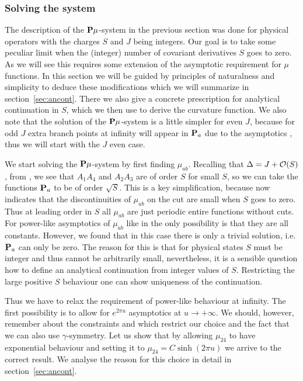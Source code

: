 \subsubsection{Solving the system}
\label{sec:slope_pmu_solve}

The description of the ${\bf P}\mu$-system in the previous section was done for physical operators with the charges $S$ and $J$ being integers. 
Our goal is to take some peculiar limit when the (integer) number of covariant derivatives $S$ goes to zero.  
As we will see this requires some extension of the asymptotic requirement for $\mu$ functions.
In this section we will be guided by principles of naturalness and simplicity to deduce these modifications which we will summarize in section~\ref{sec:ancont}. 
There we also give a concrete prescription for analytical continuation in $S$, which we then use to derive the curvature function.
We also note that the solution of the ${\bf P}\mu$-system is a little simpler for even $J$, because for odd $J$ extra branch points at infinity will appear in ${\bf P}_a$ due to the asymptotics , thus we will start with the $J$ even case.

We start solving the ${\bf P}\mu$-system by first finding $\mu_{ab}$. 
Recalling that $\Delta=J+{\cal O}(S)$, from ,  we see that $A_1A_4$ and $A_2A_3$ are of order $S$ for small $S$, so we can take the functions ${\bf P}_a$ to be of order $\sqrt{S}$. 
This is a key simplification, because now  indicates that the discontinuities of $\mu_{ab}$ on the cut are small when $S$ goes to zero. 
Thus at leading order in $S$ all $\mu_{ab}$ are just periodic entire functions without cuts.
For power-like asymptotics of $\mu_{ab}$ like in  the only possibility is that they are all constants.
However, we found that in this case there is only a trivial solution, i.e. ${\bf P}_a$ can only be zero.
The reason for this is that for physical states $S$ must be integer and thus cannot be arbitrarily small, nevertheless, it is a sensible question how to define an analytical continuation from integer values of $S$.
Restricting the large positive $S$ behaviour one can show uniqueness of the continuation.

Thus we have to relax the requirement of power-like behaviour at infinity. The first possibility is
to allow for $e^{2\pi u}$ asymptotics at $u\to +\infty$.
We should, however, remember about the constraints  and  which restrict our choice and the fact that we can also use $\gamma$-symmetry.
Let us show that by allowing $\mu_{24}$ to have exponential behaviour and setting it to $\mu_{24}=C\sinh(2\pi u)$ we arrive to the correct result. 
We analyse the reason for this choice in detail in section~\ref{sec:ancont}.

